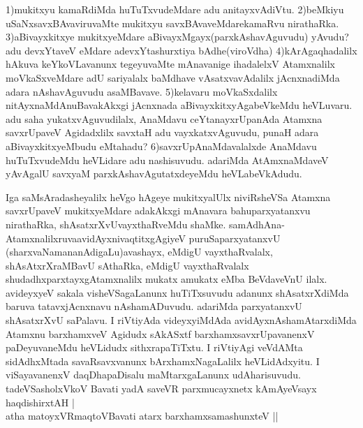 \begin{artha}
1)mukitxyu kamaRdiMda huTuTxvudeMdare adu anitayxvAdiVtu.
2)beMkiyu uSaNxsavxBAvaviruvaMte mukitxyu savxBAvaveMdare\break kamaRvu nirathaRka.
3)aBivayxkitxye mukitxyeMdare aBivayxMgayx\break (parxkAshavAguvudu) yAvudu? adu devxYtaveV eMdare adevxYta\-\break shurxtiya bAdhe(viroVdha)
4)kArAgaqhadalilx hAkuva keYkoVLavanunx tegeyuvaMte mAnavanige ihadalelxV Atamxnalilx moVkaSxveMdare adU sariyalalx baMdhave vAsatxvavAdalilx jAcnxnadiMda adara nAshavAguvudu asaMBavave.
5)kelavaru moVkaSxdalilx nitAyxnaMdAnuBavakAkxgi jAcnxnada aBivayxkitxyAgabeVkeMdu heVLuvaru. adu saha yukatxvAguvudilalx, AnaMdavu ceYtanayxrUpanAda Atamxna savxrUpaveV Agidadxlilx savxtaH adu vayxkatxvAguvudu, punaH adara aBivayxkitxyeMbudu eMtahadu?
6)savxrUpAnaMdavalalxde AnaMdavu huTuTxvudeMdu heVLidare adu nashisuvudu. adariMda AtAmxnaMdaveV yAvAgalU savxyaM parxkAshavAgutatxdeyeMdu heVLabeVkAdudu.
\end{artha}

\begin{artha}
Iga saMsAradasheyalilx heVgo hAgeye mukitxyalUlx niviRsheVSa Atamxna savxrUpaveV mukitxyeMdare adakAkxgi mAnavara bahuparxyatanxvu nirathaRka, shAsatxrXvUvayxthaRveMdu shaMke. samAdhAna-Atamxnalilxruva\break avidAyxnivaqtitxgAgiyeV puruSaparxyatanxvU (sharxvaNamananAdigaLu)\break avashayx, eMdigU vayxthaRvalalx, shAsAtxrXraMBavU sAthaRka, eMdigU vayxthaRvalalx shudadhxparxtayxgAtamxnalilx mukatx amukatx eMba BeVdaveVnU ilalx. avideyxyeV sakala visheVSagaLanunx huTiTxsuvudu adanunx shAsatxrXdiMda baruva tatavxjAcnxnavu nAshamADuvudu. adariMda parxyatanxvU shAsatxrXvU saPalavu. I riVtiyAda videyxyiMdAda avidAyxnAshamAtarxdiMda Atamxnu barxhamxveV Agidudx sAkASxtf barxhamxsavxrUpavanenxV paDeyuvaneMdu heVLidudx sithxrapaTiTxtu. I riVtiyAgi veVdAMta sidAdhxMtada savaRsavxvanunx bArxhamxNagaLalilx heVLidAdxyitu. I viSayavanenxV daqDhapaDisalu maMtarxgaLanunx udAharisuvudu.\\
tadeVSasholxVkoV Bavati yadA saveVR parxmucayxnetx kAmAyeV\s sayx haqdishirxtAH |\\ atha matoyxVR\s maqtoVBavati atarx barxhamxsamashunxteV ||
\end{artha}

